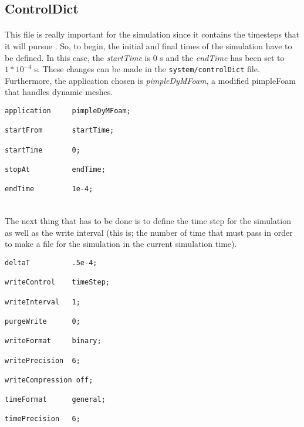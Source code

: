 \subsection{ControlDict}
\paragraph{}This file is really important for the simulation since it contains the timesteps that it will pursue . So, to begin, the initial and final times of the simulation have to be defined. In this case, the \textit{startTime} is 0 s and the \textit{endTime} has been set to $1*10^{-4}$ s. These changes can be made in the \texttt{system/controlDict} file. Furthermore, the application chosen is \textit{pimpleDyMFoam}, a modified pimpleFoam that handles dynamic meshes.

\begin{footnotesize}
\begin{verbatim}
application     pimpleDyMFoam;

startFrom       startTime;

startTime       0;

stopAt          endTime;

endTime         1e-4;


\end{verbatim}
\end{footnotesize}

\paragraph{}The next thing that has to be done is to define the time step for the simulation as well as the write interval (this is; the number of time that must pass in order to make a file for the simulation in the current simulation time). 

\begin{footnotesize}
\begin{verbatim}
deltaT          .5e-4;

writeControl    timeStep;

writeInterval   1;

purgeWrite      0;

writeFormat     binary;

writePrecision  6;

writeCompression off;

timeFormat      general;

timePrecision   6;

\end{verbatim}
\end{footnotesize}

